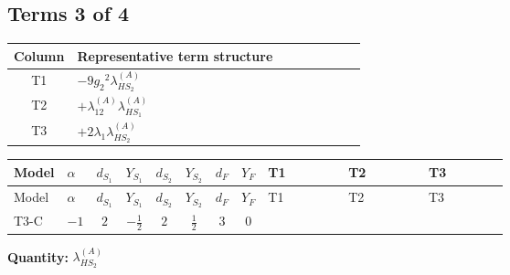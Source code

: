 \documentclass[8pt]{article}
\begin{document}
\begin{landscape}
\subsection*{Terms 3 of 4}
\begin{center}
\begin{tabular}{@{}c >{\raggedright\arraybackslash}p{0.82\linewidth}@{}}
\toprule
Column & Representative term structure \\
\midrule
T1 & \(\displaystyle -9 {g_2}^2 {\lambda_{HS_2}^{(A)}}\) \\
\midrule
T2 & \(\displaystyle +{\lambda_{12}^{(A)}} {\lambda_{HS_1}^{(A)}}\) \\
\midrule
T3 & \(\displaystyle +2 {\lambda_1} {\lambda_{HS_2}^{(A)}}\) \\
\midrule
\bottomrule
\end{tabular}
\end{center}
\smallskip
\tiny
\begin{longtable}{@{}llcccccc >{\raggedright\arraybackslash}p{0.21\linewidth} >{\raggedright\arraybackslash}p{0.21\linewidth} >{\raggedright\arraybackslash}p{0.21\linewidth}@{}}
\toprule
Model & $\alpha$ & $d_{S_1}$ & $Y_{S_1}$ & $d_{S_2}$ & $Y_{S_2}$ & $d_F$ & $Y_F$ & T1 & T2 & T3 \\
\midrule
\endfirsthead
\toprule
Model & $\alpha$ & $d_{S_1}$ & $Y_{S_1}$ & $d_{S_2}$ & $Y_{S_2}$ & $d_F$ & $Y_F$ & T1 & T2 & T3 \\
\midrule
\endhead
T3-C & $-1$ & $2$ & $-\frac{1}{2}$ & $2$ & $\frac{1}{2}$ & $3$ & $0$ & \scriptsize\adjustbox{max width=\linewidth}{$\begin{gathered} -9 {g_2}^2 {\lambda_{HS_2}^{(A)}}\end{gathered}$} & \scriptsize\adjustbox{max width=\linewidth}{$\begin{gathered} +{\lambda_{12}^{(A)}} {\lambda_{HS_1}^{(A)}}\end{gathered}$} & \scriptsize\adjustbox{max width=\linewidth}{$\begin{gathered} +2 {\lambda_1} {\lambda_{HS_2}^{(A)}}\end{gathered}$} \\
\midrule
\bottomrule
\end{longtable}
\clearpage
\noindent\textbf{Quantity: }$\lambda_{HS_2}^{(A)}$\par\smallskip

\end{landscape}
\end{document}
